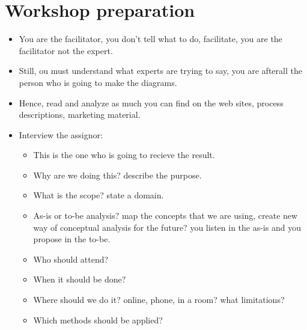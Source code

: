 \section{Workshop preparation}
\begin{itemize}
    \item You are the facilitator, you don't tell what to do, facilitate, you are the facilitator not the expert.
    \item Still, ou must understand what experts are trying to say, you are afterall the person who is going to make the diagrams.
    \item Hence, read and analyze as much you can find on the web sites, process descriptions, marketing material. 
    \item Interview the assignor:
        \begin{itemize}
            \item This is the one who is going to recieve the result.
            \item Why are we doing this? describe the purpose.
            \item What is the scope? state a domain. 
            \item As-is or to-be analysis? map the concepts that we are using, create new way of conceptual analysis for the future? you listen in the as-is and you propose in the to-be.
            \item Who should attend? 
            \item When it should be done? 
            \item Where should we do it? online, phone, in a room? what limitations? 
            \item Which methods should be applied? 
        \end{itemize}
    

\end{itemize}
